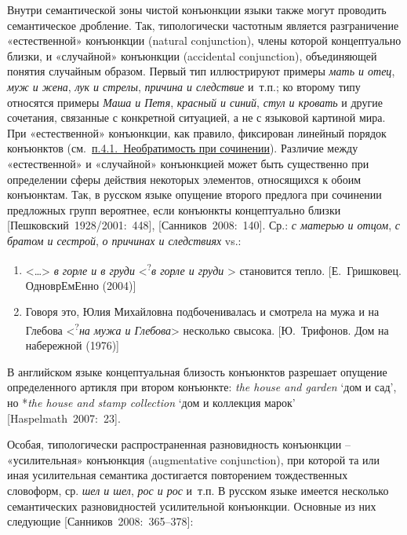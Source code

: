 Внутри семантической зоны чистой конъюнкции языки также могут проводить
семантическое дробление. Так, типологически частотным является
разграничение «естественной» конъюнкции (natural conjunction), члены
которой концептуально близки, и «случайной» конъюнкции (accidental
conjunction), объединяющей понятия случайным образом. Первый тип
иллюстрируют примеры \emph{мать и отец}, \emph{муж и жена}, \emph{лук и
стрелы}, \emph{причина и следствие} и~т.п.; ко второму типу относятся
примеры \emph{Маша и Петя}, \emph{красный и синий}, \emph{стул и
кровать} и другие сочетания, связанные с конкретной ситуацией, а не с
языковой картиной мира. При «естественной» конъюнкции, как правило,
фиксирован линейный порядок конъюнктов
(см.~\underline{п.4.1.~Необратимость при сочинении}). Различие между
«естественной» и «случайной» конъюнкцией может быть существенно при
определении сферы действия некоторых элементов, относящихся к обоим
конъюнктам. Так, в русском языке опущение второго предлога при сочинении
предложных групп вероятнее, если конъюнкты концептуально близки
{[}Пешковский~1928/2001:~448{]}, {[}Санников~2008:~140{]}. Ср.: \emph{с
матерью и отцом}, \emph{с братом и сестрой}, \emph{о причинах и
следствиях} vs.:

\begin{enumerate}
\def\labelenumi{(\arabic{enumi})}
\setcounter{enumi}{158}
\item
  \textless\ldots\textgreater{} \emph{в горле и в груди}
  \textless{}\textsuperscript{?}\emph{в горле и груди} \textgreater{}
  становится тепло. {[}Е.~Гришковец. ОдноврЕмЕнно (2004){]}
\item
  Говоря это, Юлия Михайловна подбоченивалась и смотрела на мужа и на
  Глебова \textless{}\textsuperscript{?}\emph{на мужа и
  Глебова}\textgreater{} несколько свысока. {[}Ю.~Трифонов. Дом на
  набережной (1976){]}
\end{enumerate}

В английском языке концептуальная близость конъюнктов разрешает опущение
определенного артикля при втором конъюнкте: \emph{the house and garden}
`дом и сад', но *\emph{the house and stamp collection} `дом и коллекция
марок' {[}Haspelmath~2007:~23{]}.

Особая, типологически распространенная разновидность конъюнкции --
«усилительная» конъюнкция (augmentative conjunction), при которой та или
иная усилительная семантика достигается повторением тождественных
словоформ, ср. \emph{шел и шел}, \emph{рос и рос} и~т.п. В русском языке
имеется несколько семантических разновидностей усилительной конъюнкции.
Основные из них следующие {[}Санников~2008:~365--378{]}:

